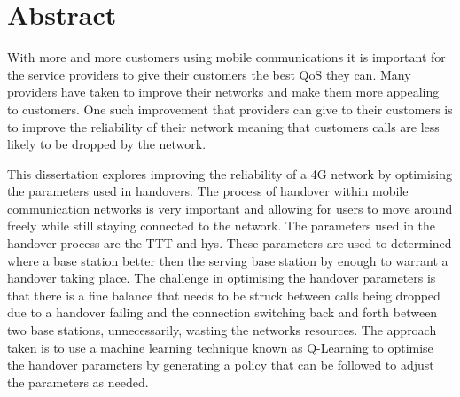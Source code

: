 \chapter*{Abstract}
With more and more customers using mobile communications it is important for the service providers to give their customers the best \ac{QoS} they can. Many providers have taken to improve their networks and make them more appealing to customers. One such improvement that providers can give to their customers is to improve the reliability of their network meaning that customers calls are less likely to be dropped by the network.

This dissertation explores improving the reliability of a 4G network by optimising the parameters used in handovers. The process of handover within mobile communication networks is very important and allowing for users to move around freely while still staying connected to the network. The parameters used in the handover process are the \ac{TTT} and \ac{hys}. These parameters are used to determined where a base station better then the serving base station by enough to warrant a handover taking place. The challenge in optimising the handover parameters is that there is a fine balance that needs to be struck between calls being dropped due to a handover failing and the connection switching back and forth between two base stations, unnecessarily, wasting the networks resources. The approach taken is to use a machine learning technique known as Q-Learning to optimise the handover parameters by generating a policy that can be followed to adjust the parameters as needed.
\pagebreak